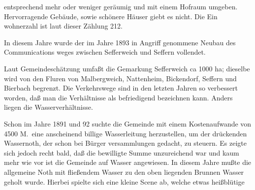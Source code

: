 

entsprechend mehr oder weniger geräumig und mit\ob
einem Hofraum umgeben. Hervorragende Gebäude,\ob
sowie schönere Häuser giebt es nicht. Die Ein\ohb
{}%
wohnerzahl ist laut dieser Zählung 212.

In diesem Jahre wurde der im Jahre 1893 in Angriff\ob
genommene Neubau des Communications\ohb
weges zwischen Sefferweich und Seffern vollendet.

%
Laut Gemeindeschätzung umfaßt die Gemarkung\ob
Sefferweich ca 1000 ha; dieselbe wird von den\ob
Fluren von Malbergweich, Nattenheim, Bickendorf,\ob
Seffern und Bierbach begrenzt. Die Verkehrswege\ob
sind in den letzten Jahren so verbessert worden, daß\ob
man die Verhältnisse als befriedigend bezeichnen\ob
kann. Anders liegen die Wasserverhältnisse.

%
Schon im Jahre 1891 und 92 suchte die Gemeinde\ob
mit einem Kostenaufwande von 4500 M.\ eine\ob
anscheinend billige Wasserleitung herzustellen, um\ob
der drückenden Wassernoth, der schon bei Bürger\ohb
versammlungen gedacht, zu steuern. Es zeigte sich jedoch\ob
recht bald, daß die bewilligte Summe unzureichend\ob
war und kaum mehr wie vor ist die Gemeinde auf\ob
Wasser angewiesen. In diesem Jahre mußte die allgemeine\ob
Noth mit fließendem Wasser zu den oben\ob
liegenden Brunnen\unsicher\ob
Wasser geholt wurde. Hierbei spielte sich eine kleine\ob
Scene ab, welche etwas heißblütige
\pend
